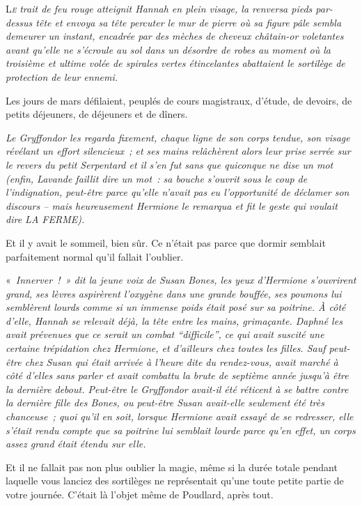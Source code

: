 
\lettrine{L}{\emph{e}} \emph{trait de feu rouge atteignit Hannah en plein visage, la renversa pieds par-dessus tête et envoya sa tête percuter le mur de pierre où sa figure pâle sembla demeurer un instant, encadrée par des mèches de cheveux châtain-or voletantes avant qu'elle ne s'écroule au sol dans un désordre de robes au moment où la troisième et ultime volée de spirales vertes étincelantes abattaient le sortilège de protection de leur ennemi.}

Les jours de mars défilaient, peuplés de cours magistraux, d'étude, de devoirs, de petits déjeuners, de déjeuners et de dîners.

\emph{Le Gryffondor les regarda fixement, chaque ligne de son corps tendue, son visage révélant un effort silencieux~; et ses mains relâchèrent alors leur prise serrée sur le revers du petit Serpentard et il s'en fut sans que quiconque ne dise un mot (enfin, Lavande faillit dire un mot~: sa bouche s'ouvrit sous le coup de l'indignation, peut-être parce qu'elle n'avait pas eu l'opportunité de déclamer son discours -- mais heureusement Hermione le remarqua et fit le geste qui voulait dire LA FERME).}

Et il y avait le sommeil, bien sûr. Ce n'était pas parce que dormir semblait parfaitement normal qu'il fallait l'oublier.

«~\emph{Innerver~!~» dit la jeune voix de Susan Bones, les yeux d'Hermione s'ouvrirent grand, ses lèvres aspirèrent l'oxygène dans une grande bouffée, ses poumons lui semblèrent lourds comme si un immense poids était posé sur sa poitrine. À côté d'elle, Hannah se relevait déjà, la tête entre les mains, grimaçante. Daphné les avait prévenues que ce serait un combat “difficile”, ce qui avait suscité une certaine trépidation chez Hermione, et d'ailleurs chez toutes les filles. Sauf peut-être chez Susan qui était arrivée à l'heure dite du rendez-vous, avait marché à côté d'elles sans parler et avait combattu la brute de septième année jusqu'à être la dernière debout. Peut-être le Gryffondor avait-il été réticent à se battre contre la dernière fille des Bones, ou peut-être Susan avait-elle seulement été très chanceuse~; quoi qu'il en soit, lorsque Hermione avait essayé de se redresser, elle s'était rendu compte que sa poitrine lui semblait lourde parce qu'en effet, un corps assez grand était étendu sur elle.}

Et il ne fallait pas non plus oublier la magie, même si la durée totale pendant laquelle vous lanciez des sortilèges ne représentait qu'une toute petite partie de votre journée. C'était là l'objet même de Poudlard, après tout.

